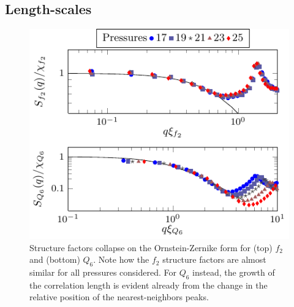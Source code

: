 \documentclass[twocolumn,superscriptaddress]{revtex4}
\begin{document}
\subsection{Length-scales}\label{sec:lengths}
\begin{figure}
	\centering
	\includegraphics{fig_structurefactor}
	\caption{Structure factors collapse on the Ornstein-Zernike form for (top) $f_2$ and (bottom) $Q_6$. Note how the $f_2$ structure factors are almost similar for all pressures considered. 
	For $Q_6$ instead, the growth of the correlation length is evident already from the change in the relative position of the nearest-neighbors peaks. }
	\label{fig:structurefactor}
\end{figure}
\end{document}
